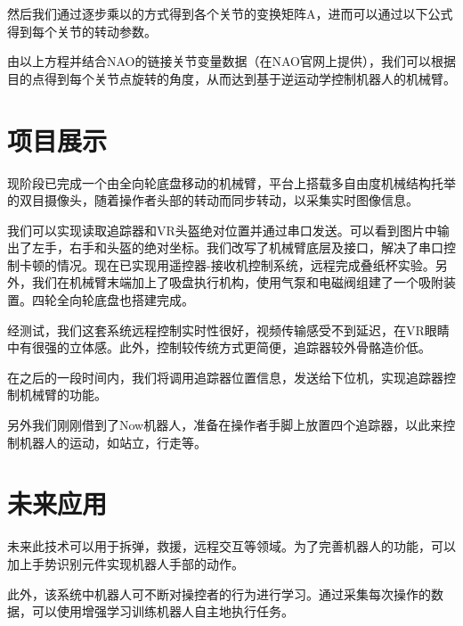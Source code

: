 然后我们通过逐步乘以的方式得到各个关节的变换矩阵A，进而可以通过以下公式得到每个关节的转动参数。

由以上方程并结合NAO的链接关节变量数据（在NAO官网上提供），我们可以根据目的点得到每个关节点旋转的角度，从而达到基于逆运动学控制机器人的机械臂。



\chapter{项目展示}

现阶段已完成一个由全向轮底盘移动的机械臂，平台上搭载多自由度机械结构托举的双目摄像头，随着操作者头部的转动而同步转动，以采集实时图像信息。

我们可以实现读取追踪器和VR头盔绝对位置并通过串口发送。可以看到图片中输出了左手，右手和头盔的绝对坐标。我们改写了机械臂底层及接口，解决了串口控制卡顿的情况。现在已实现用遥控器-接收机控制系统，远程完成叠纸杯实验。另外，我们在机械臂末端加上了吸盘执行机构，使用气泵和电磁阀组建了一个吸附装置。四轮全向轮底盘也搭建完成。

经测试，我们这套系统远程控制实时性很好，视频传输感受不到延迟，在VR眼睛中有很强的立体感。此外，控制较传统方式更简便，追踪器较外骨骼造价低。

在之后的一段时间内，我们将调用追踪器位置信息，发送给下位机，实现追踪器控制机械臂的功能。

另外我们刚刚借到了Now机器人，准备在操作者手脚上放置四个追踪器，以此来控制机器人的运动，如站立，行走等。


\section{}

\section{}



\chapter{未来应用}
未来此技术可以用于拆弹，救援，远程交互等领域。为了完善机器人的功能，可以加上手势识别元件实现机器人手部的动作。

此外，该系统中机器人可不断对操控者的行为进行学习。通过采集每次操作的数据，可以使用增强学习训练机器人自主地执行任务。
